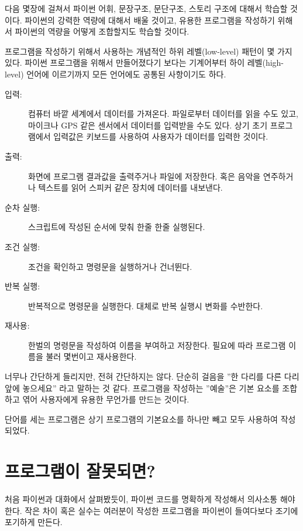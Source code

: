 다음 몇장에 걸쳐서 파이썬 어휘, 문장구조, 문단구조, 스토리 구조에 대해서 학습할 것이다. 
파이썬의 강력한 역량에 대해서 배울 것이고, 유용한 프로그램을 작성하기 위해서 파이썬의 역량을 어떻게 조합할지도 학습할 것이다.

프로그램을 작성하기 위해서 사용하는 개념적인 하위 레벨(low-level) 패턴이 몇 가지 있다. 
파이썬 프로그램을 위해서 만들어졌다기 보다는 기계어부터 하이 레벨(high-level) 언어에 이르기까지 모든 언어에도 공통된 사항이기도 하다.

\begin{description}

\item[입력:] 컴퓨터 바깥 세계에서 데이터를 가져온다. 
파일로부터 데이터를 읽을 수도 있고, 마이크나 GPS 같은 센서에서 데이터를 입력받을 수도 있다. 
상기 초기 프로그램에서 입력값은 키보드를 사용하여 사용자가 데이터를 입력한 것이다.

\item[출력:] 화면에 프로그램 결과값을 출력주거나 파일에 저장한다. 
혹은 음악을 연주하거나 텍스트를 읽어 스피커 같은 장치에 데이터를 내보낸다.

\item[순차 실행:] 스크립트에 작성된 순서에 맞춰 한줄 한줄 실행된다.

\item[조건 실행:] 조건을 확인하고 명령문을 실행하거나 건너뛴다.

\item[반복 실행:] 반복적으로 명령문을 실행한다. 대체로 반복 실행시 변화를 수반한다.

\item[재사용:] 한벌의 명령문을 작성하여 이름을 부여하고 저장한다. 필요에 따라 프로그램 이름을 불러 몇번이고 재사용한다.

\end{description}

너무나 간단하게 들리지만, 전혀 간단하지는 않다. 
단순히 걸음을 ''한 다리를 다른 다리 앞에 놓으세요'' 라고 말하는 것 같다. 
프로그램을 작성하는 ''예술''은 기본 요소를 조합하고 엮어 사용자에게 유용한 무언가를 만드는 것이다.

단어를 세는 프로그램은 상기 프로그램의 기본요소를 하나만 빼고 모두 사용하여 작성되었다.

\section{프로그램이 잘못되면?}

처음 파이썬과 대화에서 살펴봤듯이, 
파이썬 코드를 명확하게 작성해서 의사소통 해야 한다. 
작은 차이 혹은 실수는 여러분이 작성한 프로그램을 파이썬이 들여다보다 조기에 포기하게 만든다.

